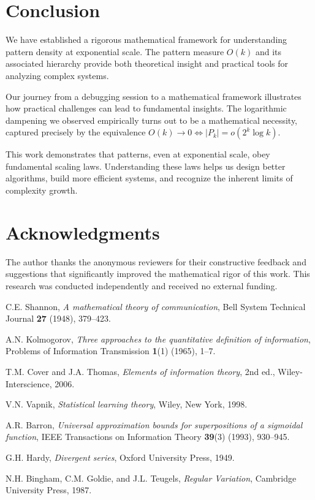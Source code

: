 \documentclass[11pt]{article}
\theoremstyle{definition}
\begin{document}
\section{Conclusion}

We have established a rigorous mathematical framework for understanding pattern density at exponential scale. The pattern measure $O(k)$ and its associated hierarchy provide both theoretical insight and practical tools for analyzing complex systems.

Our journey from a debugging session to a mathematical framework illustrates how practical challenges can lead to fundamental insights. The logarithmic dampening we observed empirically turns out to be a mathematical necessity, captured precisely by the equivalence $O(k)\to 0\iff |P_k|=o(2^k\log k)$.

This work demonstrates that patterns, even at exponential scale, obey fundamental scaling laws. Understanding these laws helps us design better algorithms, build more efficient systems, and recognize the inherent limits of complexity growth.

\section*{Acknowledgments}

The author thanks the anonymous reviewers for their constructive feedback and suggestions that significantly improved the mathematical rigor of this work. This research was conducted independently and received no external funding.

\begin{thebibliography}{99}

 C.E. Shannon, \emph{A mathematical theory of communication}, Bell System Technical Journal \textbf{27} (1948), 379--423.

 A.N. Kolmogorov, \emph{Three approaches to the quantitative definition of information}, Problems of Information Transmission \textbf{1}(1) (1965), 1--7.

 T.M. Cover and J.A. Thomas, \emph{Elements of information theory}, 2nd ed., Wiley-Interscience, 2006.

 V.N. Vapnik, \emph{Statistical learning theory}, Wiley, New York, 1998.

 A.R. Barron, \emph{Universal approximation bounds for superpositions of a sigmoidal function}, IEEE Transactions on Information Theory \textbf{39}(3) (1993), 930--945.

 G.H. Hardy, \emph{Divergent series}, Oxford University Press, 1949.

 N.H. Bingham, C.M. Goldie, and J.L. Teugels, \emph{Regular Variation}, Cambridge University Press, 1987.

\end{thebibliography}
\end{document}
